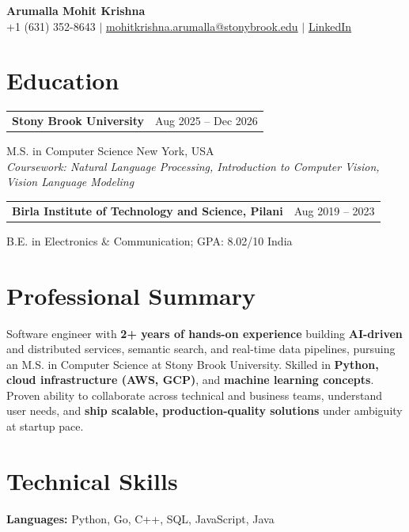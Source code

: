 \documentclass[letterpaper,10pt]{article}
\makeatletter
\newcommand{\entry}[2]{%
  \noindent
  \begin{tabularx}{\linewidth}
    {@{}>{\raggedright\arraybackslash}X@{\hspace{6pt}}r@{}}
    \textbf{#1} & #2
  \end{tabularx}\par
}
\makeatother
\begin{document}
\begin{center}
    {\LARGE\bfseries Arumalla Mohit Krishna}\\[3pt]
    +1 (631) 352-8643 $|$
    \href{mailto:mohitkrishna.arumalla@stonybrook.edu}
    {mohitkrishna.arumalla@stonybrook.edu} $|$
    \href{https://linkedin.com/in/mohit-krishna-arumalla}
    {LinkedIn}
\end{center}
\vspace{-8pt}

\section{Education}

\entry
  {\textbf{Stony Brook University}}
  {Aug 2025 -- Dec 2026}

M.S. in Computer Science \hfill New York, USA\\
\textit{
Coursework: Natural Language Processing,
Introduction to Computer Vision, Vision Language Modeling
}
\vspace{3pt}

\entry
  {\textbf{Birla Institute of Technology and Science, Pilani}}
  {Aug 2019 -- 2023}

B.E. in Electronics \& Communication; GPA: 8.02/10 \hfill India
\section{Professional Summary}

Software engineer with \textbf{2+ years of hands-on experience} building \textbf{AI-driven} and distributed services, semantic search, and real-time data pipelines, pursuing an M.S. in Computer Science at Stony Brook University. Skilled in \textbf{Python, cloud infrastructure (AWS, GCP)}, and \textbf{machine learning concepts}. Proven ability to collaborate across technical and business teams, understand user needs, and \textbf{ship scalable, production-quality solutions} under ambiguity at startup pace.

\section{Technical Skills}

\textbf{Languages:}
Python, Go, C++, SQL, JavaScript, Java\\
\end{document}
